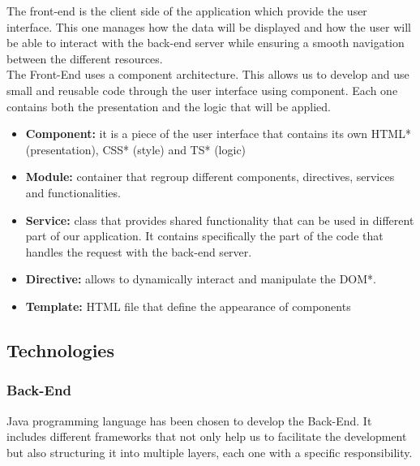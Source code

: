 \documentclass[12pt,a4paper,table,english]{article}
\begin{document}
	The front-end is the client side of the application which provide the user interface. This one manages how the data will be displayed and how the user will be able to interact with the back-end server while ensuring a smooth navigation between the different resources. \\
	
	\noindent The Front-End uses a component architecture. This allows us to develop and use small and reusable code through the user interface using component. Each one contains both the presentation and the logic that will be applied.
	
	\begin{itemize}
		\item \textbf{Component:} it is a piece of the user interface that contains its own HTML* (presentation), CSS* (style) and TS* (logic)
		
		\item \textbf{Module:} container that regroup different components, directives, services and functionalities.
		
		\item \textbf{Service:} class that provides shared functionality that can be used in different part of our application. It contains specifically the part of the code that handles the request with the back-end server.
		
		\item \textbf{Directive:} allows to dynamically interact and manipulate the DOM*. %
		
		\item \textbf{Template:} HTML file that define the appearance of components
	\end{itemize}

	\newpage
	
	\subsection{Technologies}
	
	\subsubsection{Back-End}
	
	Java programming language has been chosen to develop the Back-End. It includes different frameworks that not only help us to facilitate the development but also structuring it into multiple layers, each one with a specific responsibility.
	
\end{document}

